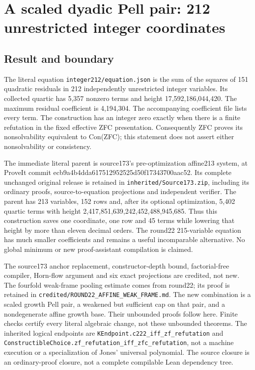 \section{A scaled dyadic Pell pair: 212 unrestricted integer
coordinates}\label{a-scaled-dyadic-pell-pair-212-unrestricted-integer-coordinates}

\subsection{Result and boundary}\label{result-and-boundary}

The literal equation \texttt{integer212/equation.json} is the sum of the
squares of 151 quadratic residuals in 212 independently unrestricted
integer variables. Its collected quartic has 5,357 nonzero terms and
height 17,592,186,044,420. The maximum residual coefficient is
4,194,304. The accompanying coefficient file lists every term. The
construction has an integer zero exactly when there is a finite
refutation in the fixed effective ZFC presentation. Consequently ZFC
proves its nonsolvability equivalent to Con(ZFC); this statement does
not assert either nonsolvability or consistency.

The immediate literal parent is source173's pre-optimization affine213
system, at ProveIt commit ecb9a4b4dda617512952525d50f17343700aac52. Its
complete unchanged original release is retained in
\texttt{inherited/Source173.zip}, including its ordinary proofs,
source-to-equation projections and independent verifier. The parent has
213 variables, 152 rows and, after its optional optimization, 5,402
quartic terms with height 2,417,851,639,242,452,488,945,685. Thus this
construction saves one coordinate, one row and 45 terms while lowering
that height by more than eleven decimal orders. The round22 215-variable
equation has much smaller coefficients and remains a useful incomparable
alternative. No global minimum or new proof-assistant compilation is
claimed.

The source173 anchor replacement, constructor-depth bound,
factorial-free compiler, Horn-flow argument and six exact projections
are credited, not new. The fourfold weak-frame pooling estimate comes
from round22; its proof is retained in
\texttt{credited/ROUND22\_AFFINE\_WEAK\_FRAME.md}. The new combination
is a scaled growth Pell pair, a weakened but sufficient cap on that
pair, and a nondegenerate affine growth base. Their unbounded proofs
follow here. Finite checks certify every literal algebraic change, not
these unbounded theorems. The inherited logical endpoints are
\texttt{KEndpoint.c222\_iff\_zf\_refutation} and
\texttt{ConstructibleChoice.zf\_refutation\_iff\_zfc\_refutation}, not a
machine execution or a specialization of Jones' universal polynomial.
The source closure is an ordinary-proof closure, not a complete
compilable Lean dependency tree.

